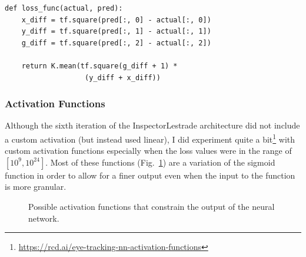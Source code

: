 \documentclass[aip, rsi, amsmath, amssymb, reprint, author-year, longbibliography]{revtex4-1}
\begin{document}
\begin{lstlisting}
def loss_func(actual, pred):
    x_diff = tf.square(pred[:, 0] - actual[:, 0])
    y_diff = tf.square(pred[:, 1] - actual[:, 1])
    g_diff = tf.square(pred[:, 2] - actual[:, 2])

    return K.mean(tf.square(g_diff + 1) *
                   (y_diff + x_diff))
\end{lstlisting}

\subsubsection{\label{sec:actfunc} Activation Functions}

Although the sixth iteration of the InspectorLestrade architecture did not
include a custom activation (but instead used linear), I did experiment quite a
bit\footnote{\url{https://rcd.ai/eye-tracking-nn-activation-functions}} with
custom activation functions especially when the loss values were in the range of
$[10^9, 10^{24}]$. Most of these functions (Fig.~\ref{fig:actplots}) are a
variation of the sigmoid function in order to allow for a finer output even when
the input to the function is more granular.

\begin{figure}
\caption{\label{fig:actplots} Possible activation functions that constrain the
  output of the neural network.}
\end{figure}
\end{document}
